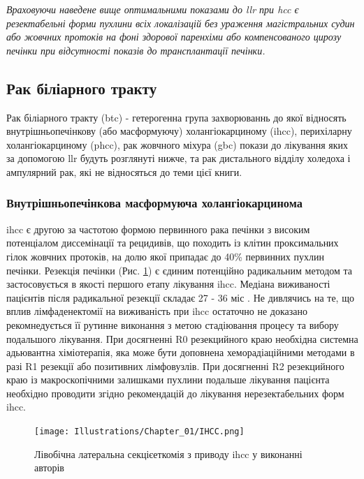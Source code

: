 \begin{refsection}
\emph{Враховуючи наведене вище оптимальними показами до \acrshort{llr} при \acrshort{hcc} є резектабельні форми пухлини всіх локалізацій без ураження магістральних судин або жовчних протоків на фоні здорової паренхіми або компенсованого цирозу печінки при відсутності показів до трансплантації печінки.}

\subsection{Рак біліарного тракту}

Рак біліарного тракту (\acrshort{btc}) - гетерогенна група захворюваннь до якої відносять внутрішньопечінкову (або масформуючу) холангіокарциному (\acrshort{ihcc}), перихіларну холангіокарциному (\acrshort{phcc}), рак жовчного міхура (\acrshort{gbc}) покази до лікування яких за допомогою \acrshort{llr} будуть розглянуті нижче, та рак дистального відділу холедоха і ампулярний рак, які не відносяться до теми цієї книги. 

\subsubsection{Внутрішньопечінкова масформуюча холангіокарцинома}

\acrshort{ihcc} є другою за частотою формою первинного рака печінки з високим потенціалом диссемінації та рецидивів, що походить із клітин проксимальних гілок жовчних протоків, на долю якої припадає до 40\% первинних пухлин печінки. Резекція печінки (Рис. \ref{fig:IHCC}) є єдиним потенційно радикальним методом та застосовується в якості першого етапу лікування \acrshort{ihcc}. Медіана виживаності пацієнтів після радикальної резекції складає 27 - 36 міс \cite{Buettner2017}. Не дивлячись на те, що вплив лімфаденектомії на виживаність при \acrshort{ihcc} остаточно не доказано рекомнедується її рутинне виконання з метою стадіювання процесу та вибору подальшого лікування. При досягненні R0 резекцийного краю необхідна системна адьювантна хіміотерапія, яка може бути доповнена хеморадіаційними методами в разі R1 резекції або позитивних лімфовузлів. При досягненні R2 резекцийного краю із макроскопічними залишками пухлини подальше лікування пацієнта необхідно проводити згідно рекомендацій до лікування нерезектабельних форм \acrshort{ihcc}. 


\begin{figure}[htbp]
\caption{Лівобічна латеральна секцієеткомія з приводу \acrshort{ihcc} у виконанні авторів}


\texttt{[image: Illustrations/Chapter\_01/IHCC.png]}
\label{fig:IHCC}


\end{figure}
\end{refsection}
